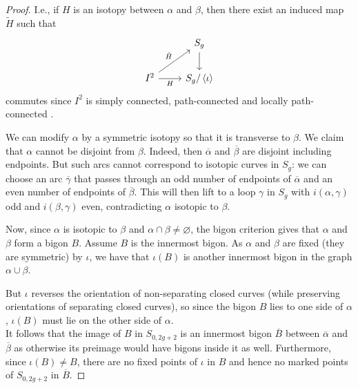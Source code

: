 \documentclass[reqno]{amsart}
\theoremstyle{definition}
\theoremstyle{remark}
\begin{document}
\begin{proof}
       I.e., if
       $H$ is an isotopy between $\alpha$ and $\beta$, then
       there exist an induced map $\tilde{H}$ such that
       \begin{equation*}
       \begin{tikzcd}
           & S_g \ar[d] \\
           I^2 \ar[ru, "\tilde{H}"] \ar[r, "H"'] &
           S_g / \left<\iota \right>
       \end{tikzcd}
       \end{equation*}
       commutes since $I^2$ is simply connected,
       path-connected and locally path-connected
       \cite[Cor~4.2]{Bredon}.
       
       We can modify $\alpha$ by a symmetric
       isotopy so that it is transverse to $\beta$.
       We claim that $\alpha$ cannot be
       disjoint from $\beta$. Indeed,
       then $\overline{\alpha}$ and $\overline{\beta}$ 
       are disjoint including endpoints. But
       such arcs cannot correspond
       to isotopic curves in $S_g$: we can choose
       an arc $\overline{\gamma}$ that passes through
        an odd number of endpoints of
        $\overline{\alpha}$ and
        an even number of endpoints of $\overline{\beta}$.
        This will then lift to a loop
        $\gamma$ in $S_g$ with
        $i \left( \alpha, \gamma \right) $ odd
        and $i \left( \beta, \gamma \right) $ even, contradicting
        $\alpha$ isotopic to $\beta$.

        Now, since $\alpha$ is isotopic to $\beta$ and
        $\alpha \cap \beta \neq \varnothing$, the bigon
        criterion gives that
        $\alpha$ and $\beta$ form a bigon $B$. Assume
        $B$ is the innermost bigon. As
        $\alpha$ and $\beta$ are fixed (they are symmetric) by
        $\iota$, we have that $\iota (B)$ is another
        innermost bigon in the graph
        $\alpha \cup \beta$.

        But $\iota$ reverses the orientation of non-separating
        closed curves (while preserving orientations
        of separating closed curves), so
        since the bigon $B$ lies to one side of $\alpha$,
        $\iota(B)$ must lie on the other side of $\alpha$.\\
        \linebreak
        It follows that the image of 
        $B$ in $S_{0,2g+2}$ is an innermost bigon $\overline{B}$ 
        between $\overline{\alpha}$ and $\overline{\beta}$ as
        otherwise its preimage would have bigons inside it
        as well.
        Furthermore, since $\iota (B) \neq B$, there are
        no fixed points of $\iota$ in $B$ and hence
        no marked points of
        $S_{0,2g+2}$ in $\overline{B}$.


\end{proof}
\end{document}
